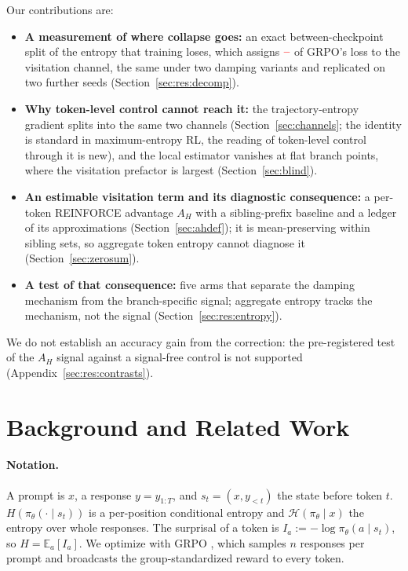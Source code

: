 \documentclass[11pt]{article}
\newcommand{\Htraj}{\mathcal{H}}
\newcommand{\AH}{A_{H}}
\newcommand{\E}{\mathbb{E}}
\newcommand{\pit}{\pi_{\theta}}
\providecommand{\PENDING}{\textcolor{red}{\textbf{--}}}
\newcommand{\num}[1]{\ifcsname #1\endcsname\csname #1\endcsname\else\PENDING\fi}
\begin{document}
Our contributions are:
\begin{itemize}\setlength\itemsep{1pt}
\item \textbf{A measurement of where collapse goes:} an exact between-checkpoint split
      of the entropy that training loses, which assigns $\num{DecGrpoShare}$ of GRPO's
      loss to the visitation channel, the same under two damping variants and
      replicated on two further seeds (Section~\ref{sec:res:decomp}).
\item \textbf{Why token-level control cannot reach it:} the trajectory-entropy gradient
      splits into the same two channels (Section~\ref{sec:channels}; the identity is
      standard in maximum-entropy RL, the reading of token-level control through it is
      new), and the local estimator vanishes at flat branch points, where the
      visitation prefactor is largest (Section~\ref{sec:blind}).
\item \textbf{An estimable visitation term and its diagnostic consequence:} a per-token
      REINFORCE advantage $\AH$ with a sibling-prefix baseline and a ledger of its
      approximations (Section~\ref{sec:ahdef}); it is mean-preserving within sibling
      sets, so aggregate token entropy cannot diagnose it (Section~\ref{sec:zerosum}).
\item \textbf{A test of that consequence:} five arms that separate the damping
      mechanism from the branch-specific signal; aggregate entropy tracks the
      mechanism, not the signal (Section~\ref{sec:res:entropy}).
\end{itemize}
We do not establish an accuracy gain from the correction: the pre-registered test of
the $\AH$ signal against a signal-free control is not supported
(Appendix~\ref{sec:res:contrasts}).

\section{Background and Related Work}
\label{sec:prelim}

\paragraph{Notation.} A prompt is $x$, a response $y = y_{1:T}$, and $s_t = (x,
y_{<t})$ the state before token $t$. $H(\pit(\cdot \mid s_t))$ is a per-position
conditional entropy and $\Htraj(\pit \mid x)$ the entropy over whole responses. The
surprisal of a token is $I_a := -\log \pit(a \mid s_t)$, so $H = \E_{a}[I_a]$. We
optimize with GRPO \citep{shao2024deepseekmath}, which samples $n$ responses per prompt
and broadcasts the group-standardized reward to every token.
\end{document}
